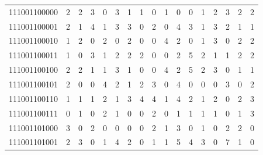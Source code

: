 \documentclass[10pt,a4paper]{article}
\begin{document}
\begin{longtable}{ |c|c|c|c|c|c|c|c|c|c|c|c|c|c|c|c|c| }
    111001100000              & 2                            & 2                                & 3                            & 0                              & 3   & 1   & 1   & 0   & 1   & 0   & 0   & 1   & 2   & 3   & 2   & 2   \\
    111001100001              & 2                            & 1                                & 4                            & 1                              & 3   & 3   & 0   & 2   & 0   & 4   & 3   & 1   & 3   & 2   & 1   & 1   \\
    111001100010              & 1                            & 2                                & 0                            & 2                              & 0   & 2   & 0   & 0   & 4   & 2   & 0   & 1   & 3   & 0   & 2   & 2   \\
    111001100011              & 1                            & 0                                & 3                            & 1                              & 2   & 2   & 2   & 0   & 0   & 2   & 5   & 2   & 1   & 1   & 2   & 2   \\
    111001100100              & 2                            & 2                                & 1                            & 1                              & 3   & 1   & 0   & 0   & 4   & 2   & 5   & 2   & 3   & 0   & 1   & 1   \\
    111001100101              & 2                            & 0                                & 0                            & 4                              & 2   & 1   & 2   & 3   & 0   & 4   & 0   & 0   & 0   & 3   & 0   & 2   \\
    111001100110              & 1                            & 1                                & 1                            & 2                              & 1   & 3   & 4   & 4   & 1   & 4   & 2   & 1   & 2   & 0   & 2   & 3   \\
    111001100111              & 0                            & 1                                & 0                            & 2                              & 1   & 0   & 0   & 2   & 0   & 1   & 1   & 1   & 1   & 0   & 1   & 3   \\
    111001101000              & 3                            & 0                                & 2                            & 0                              & 0   & 0   & 0   & 2   & 1   & 3   & 0   & 1   & 0   & 2   & 2   & 0   \\
    111001101001              & 2                            & 3                                & 0                            & 1                              & 4   & 2   & 0   & 1   & 1   & 5   & 4   & 3   & 0   & 7   & 1   & 0   \\

\end{longtable}
\end{document}
